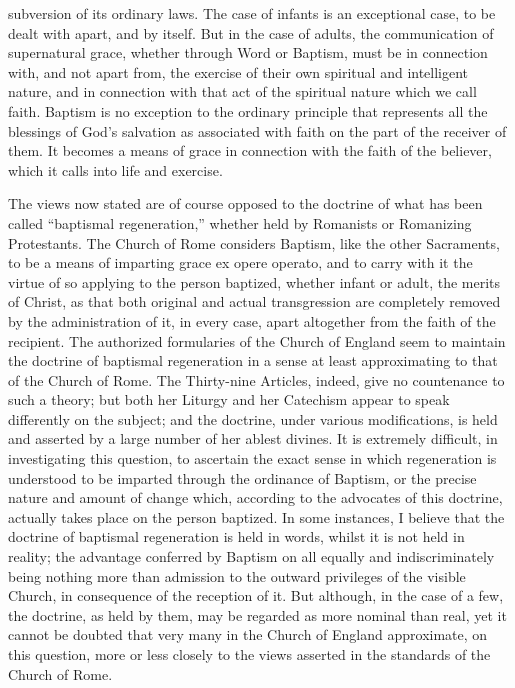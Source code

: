 \documentclass[]{book}
\begin{document}
subversion of its ordinary laws. The case of infants is an exceptional case, to be dealt with apart, and by itself. But in the case of adults, the communication of supernatural grace, whether through Word or Baptism, must be in connection with, and not apart from, the exercise of their own spiritual and intelligent nature, and in connection with that act of the spiritual nature which we call faith. Baptism is no exception to the ordinary principle that represents all the blessings of God's salvation as associated with faith on the part of the receiver of them. It becomes a means of grace in connection with the faith of the believer, which it calls into life and exercise.

The views now stated are of course opposed to the doctrine of what has been called ``baptismal regeneration,'' whether held by Romanists or Romanizing Protestants. The Church of Rome considers Baptism, like the other Sacraments, to be a means of imparting grace ex opere operato, and to carry with it the virtue of so applying to the person baptized, whether infant or adult, the merits of Christ, as that both original and actual transgression are completely removed by the administration of it, in every case, apart altogether from the faith of the recipient. The authorized formularies of the Church of England seem to maintain the doctrine of baptismal regeneration in a sense at least approximating to that of the Church of Rome. The Thirty-nine Articles, indeed, give no countenance to such a theory; but both her Liturgy and her Catechism appear to speak differently on the subject; and the doctrine, under various modifications, is held and asserted by a large number of her ablest divines. It is extremely difficult, in investigating this question, to ascertain the exact sense in which regeneration is understood to be imparted through the ordinance of Baptism, or the precise nature and amount of change which, according to the advocates of this doctrine, actually takes place on the person baptized. In some instances, I believe that the doctrine of baptismal regeneration is held in words, whilst it is not held in reality; the advantage conferred by Baptism on all equally and indiscriminately being nothing more than admission to the outward privileges of the visible Church, in consequence of the reception of it. But although, in the case of a few, the doctrine, as held by them, may be regarded as more nominal than real, yet it cannot be doubted that very many in the Church of England approximate, on this question, more or less closely to the views asserted in the standards of the Church of Rome.
\end{document}
